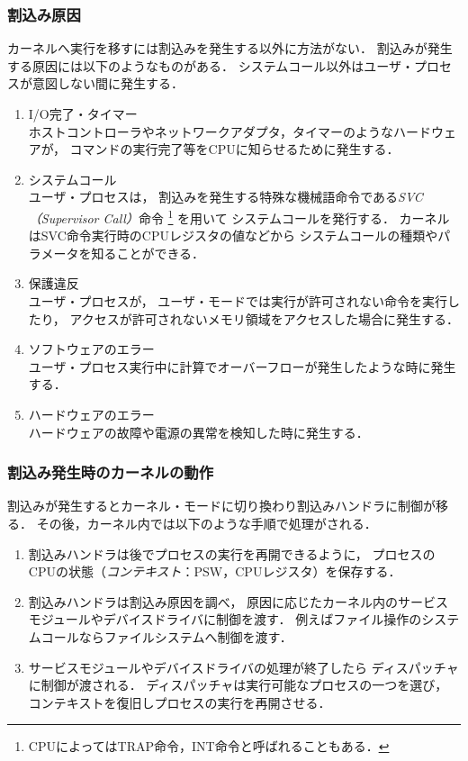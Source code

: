 \subsubsection{割込み原因}
\label{interruptSource}
カーネルへ実行を移すには割込みを発生する以外に方法がない．
割込みが発生する原因には以下のようなものがある．
システムコール以外はユーザ・プロセスが意図しない間に発生する．

\begin{enumerate}
\item I/O完了・タイマー \\
  ホストコントローラやネットワークアダプタ，タイマーのようなハードウェアが，
  コマンドの実行完了等をCPUに知らせるために発生する．
\item システムコール \\
  ユーザ・プロセスは，
  割込みを発生する特殊な機械語命令である\emph{SVC（Supervisor Call）}命令
  \footnote{
    CPUによってはTRAP命令，INT命令と呼ばれることもある．
  }
  を用いて
  システムコールを発行する．
  カーネルはSVC命令実行時のCPUレジスタの値などから
  システムコールの種類やパラメータを知ることができる．
\item 保護違反 \\
  ユーザ・プロセスが，
  ユーザ・モードでは実行が許可されない命令を実行したり，
  アクセスが許可されないメモリ領域をアクセスした場合に発生する．
\item ソフトウェアのエラー \\
  ユーザ・プロセス実行中に計算でオーバーフローが発生したような時に発生する．
\item ハードウェアのエラー \\
  ハードウェアの故障や電源の異常を検知した時に発生する．
\end{enumerate}

\subsubsection{割込み発生時のカーネルの動作}
割込みが発生するとカーネル・モードに切り換わり割込みハンドラに制御が移る．
その後，カーネル内では以下のような手順で処理がされる．

\begin{enumerate}
\item 割込みハンドラは後でプロセスの実行を再開できるように，
  プロセスのCPUの状態（\emph{コンテキスト}：PSW，CPUレジスタ）を保存する．
\item 割込みハンドラは割込み原因を調べ，
  原因に応じたカーネル内のサービスモジュールやデバイスドライバに制御を渡す．
  例えばファイル操作のシステムコールならファイルシステムへ制御を渡す．
\item サービスモジュールやデバイスドライバの処理が終了したら
  ディスパッチャに制御が渡される．
  ディスパッチャは実行可能なプロセスの一つを選び，
  コンテキストを復旧しプロセスの実行を再開させる．
\end{enumerate}


